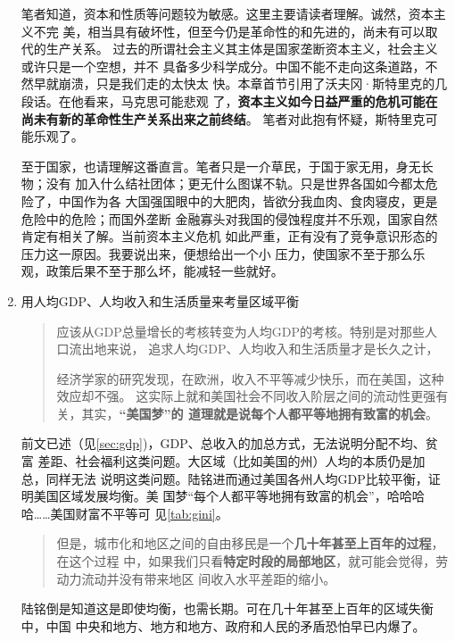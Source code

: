 \begin{enumerate}
  笔者知道，资本和性质等问题较为敏感。这里主要请读者理解。诚然，资本主义不完
  美，相当具有破坏性，但至今仍是革命性的和先进的，尚未有可以取代的生产关系。
  过去的所谓社会主义其主体是国家垄断资本主义，社会主义或许只是一个空想，并不
  具备多少科学成分。中国不能不走向这条道路，不然早就崩溃，只是我们走的太快太
  快。本章首节引用了沃夫冈·斯特里克的几段话。在他看来，马克思可能悲观
  了，\textbf{资本主义如今日益严重的危机可能在尚未有新的革命性生产关系出来之前终结}。
  笔者对此抱有怀疑，斯特里克可能乐观了。

  至于国家，也请理解这番直言。笔者只是一介草民，于国于家无用，身无长物；没有
  加入什么结社团体；更无什么图谋不轨。只是世界各国如今都太危险了，中国作为各
  大国强国眼中的大肥肉，皆欲分我血肉、食肉寝皮，更是危险中的危险；而国外垄断
  金融寡头对我国的侵蚀程度并不乐观，国家自然肯定有相关了解。当前资本主义危机
  如此严重，正有没有了竞争意识形态的压力这一原因。我要说出来，便想给出一个小
  压力，使国家不至于那么乐观，政策后果不至于那么坏，能减轻一些就好。


\item 用人均GDP、人均收入和生活质量来考量区域平衡

  \begin{quotation}
    应该从GDP总量增长的考核转变为人均GDP的考核。特别是对那些人口流出地来说，
    追求人均GDP、人均收入和生活质量才是长久之计，

    经济学家的研究发现，在欧洲，收入不平等减少快乐，而在美国，这种效应却不强。
    这实际上就和美国社会不同收入阶层之间的流动性更强有关，其实，\textbf{“美国梦”的
    道理就是说每个人都平等地拥有致富的机会}。
  \end{quotation}

  前文已述（见\cref{sec:gdp})，GDP、总收入的加总方式，无法说明分配不均、贫富
  差距、社会福利这类问题。大区域（比如美国的州）人均的本质仍是加总，同样无法
  说明这类问题。陆铭进而通过美国各州人均GDP比较平衡，证明美国区域发展均衡。美
  国梦“每个人都平等地拥有致富的机会”，哈哈哈哈……美国财富不平等可
  见\cref{tab:gini}。

  \begin{quotation}
  但是，城市化和地区之间的自由移民是一个\textbf{几十年甚至上百年的过程}，在这个过程
  中，如果我们只看\textbf{特定时段的局部地区}，就可能会觉得，劳动力流动并没有带来地区
  间收入水平差距的缩小。
  \end{quotation}
  陆铭倒是知道这是即使均衡，也需长期。可在几十年甚至上百年的区域失衡中，中国
  中央和地方、地方和地方、政府和人民的矛盾恐怕早已内爆了。


\end{enumerate}
